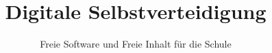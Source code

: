 \documentclass{beamer}
\begin{document}
\title{Digitale Selbstverteidigung}
\subtitle{Freie Software und Freie Inhalt für die Schule}

\maketitle
\end{document}
